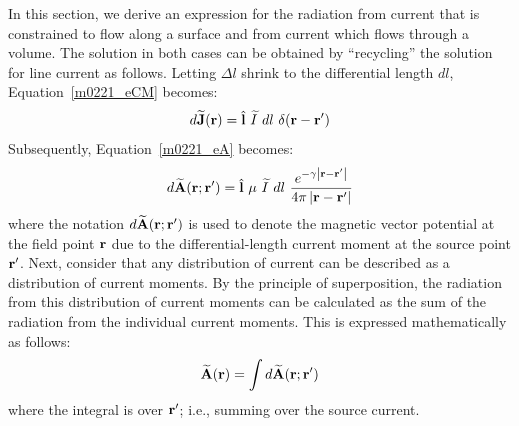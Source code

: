 In this section, we derive an expression for the radiation from current that is constrained to flow along a surface 
and from current which flows through a volume. 
The solution in both cases can be obtained by ``recycling'' the solution for line current as follows.
Letting $\Delta l$ shrink to the differential length $dl$, Equation~\ref{m0221_eCM} becomes:
%
\begin{equation}
d\widetilde{\bf J}({\bf r}) = \hat{\bf l}~\widetilde{I}~dl~\delta({\bf r}-{\bf r}')
\label{m0221_eCMd}
\end{equation}  
%
Subsequently, Equation~\ref{m0221_eA} becomes:
%
\begin{equation}
d\widetilde{\bf A}({\bf r};{\bf r}') = \hat{\bf l}~\mu~\widetilde{I}~dl~\frac{e^{-\gamma \left|{\bf r}-{\bf r}'\right|}}{4\pi \left|{\bf r}-{\bf r}'\right|}
\label{m0221_eAd}
\end{equation}
%
where the notation $d\widetilde{\bf A}({\bf r};{\bf r}')$ is used to denote the magnetic vector potential at the field point ${\bf r}$ due to the differential-length current moment at the source point ${\bf r}'$.
Next, consider that any distribution of current can be described as a distribution of current moments.  
By the principle of superposition, 
the radiation from this distribution of current moments can be calculated as the sum of the radiation from the individual current moments.
This is expressed mathematically as follows:
%
\begin{equation}
\widetilde{\bf A}({\bf r}) = \int{ d\widetilde{\bf A}({\bf r};{\bf r}') }
\label{m0221_eAi}
\end{equation}
%
where the integral is over ${\bf r}'$; i.e., summing over the source current.

